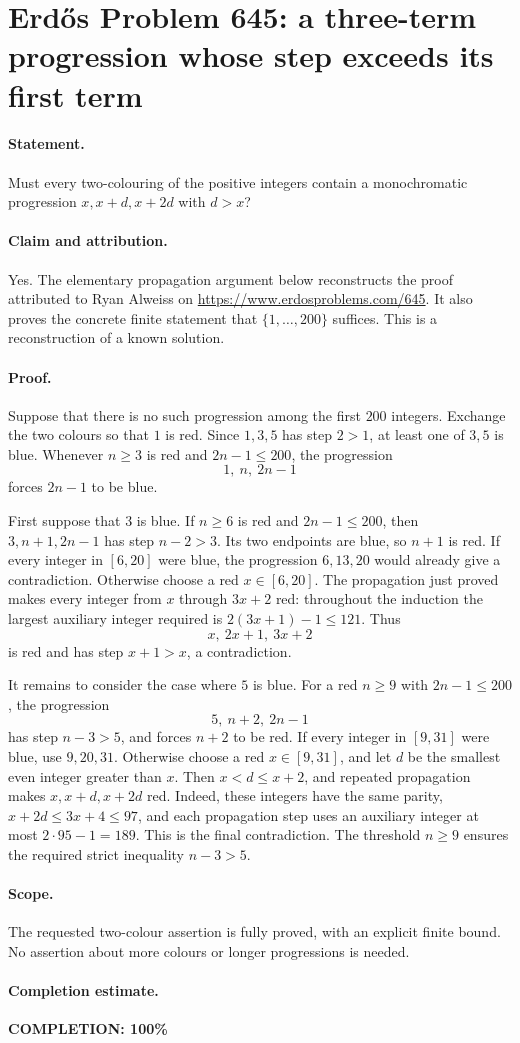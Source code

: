 \section*{Erd\H{o}s Problem 645: a three-term progression whose step exceeds its first term}

\paragraph{Statement.}
Must every two-colouring of the positive integers contain a monochromatic
progression \(x,x+d,x+2d\) with \(d>x\)?

\paragraph{Claim and attribution.}
Yes. The elementary propagation argument below reconstructs the proof attributed
to Ryan Alweiss on \url{https://www.erdosproblems.com/645}.
It also proves the concrete finite statement that \(\{1,\ldots,200\}\) suffices.
This is a reconstruction of a known solution.

\paragraph{Proof.}
Suppose that there is no such progression among the first \(200\) integers.
Exchange the two colours so that \(1\) is red. Since \(1,3,5\) has
step \(2>1\), at least one of \(3,5\) is blue.
Whenever \(n\geq3\) is red and \(2n-1\leq200\), the progression
\[
 1,\ n,\ 2n-1
\]
forces \(2n-1\) to be blue.

First suppose that \(3\) is blue. If \(n\geq6\) is red and
\(2n-1\leq200\), then \(3,n+1,2n-1\) has step \(n-2>3\).
Its two endpoints are blue, so \(n+1\) is red. If every integer in
\([6,20]\) were blue, the progression \(6,13,20\) would already give a
contradiction. Otherwise choose a red \(x\in[6,20]\). The propagation just
proved makes every integer from \(x\) through \(3x+2\) red: throughout the
induction the largest auxiliary integer required is
\(2(3x+1)-1\leq121\). Thus
\[
 x,\ 2x+1,\ 3x+2
\]
is red and has step \(x+1>x\), a contradiction.

It remains to consider the case where \(5\) is blue. For a red \(n\geq9\)
with \(2n-1\leq200\), the progression
\[
 5,\ n+2,\ 2n-1
\]
has step \(n-3>5\), and forces \(n+2\) to be red.
If every integer in \([9,31]\) were blue, use \(9,20,31\).
Otherwise choose a red \(x\in[9,31]\), and let \(d\) be the smallest
even integer greater than \(x\). Then \(x<d\leq x+2\), and repeated
propagation makes \(x,x+d,x+2d\) red. Indeed, these integers have the
same parity, \(x+2d\leq3x+4\leq97\), and each propagation step uses an
auxiliary integer at most \(2\cdot95-1=189\). This is the final
contradiction. The threshold \(n\geq9\) ensures the required strict
inequality \(n-3>5\).

\paragraph{Scope.}
The requested two-colour assertion is fully proved, with an explicit
finite bound. No assertion about more colours or longer progressions
is needed.

\paragraph{Completion estimate.}
\textbf{COMPLETION: 100\%}
